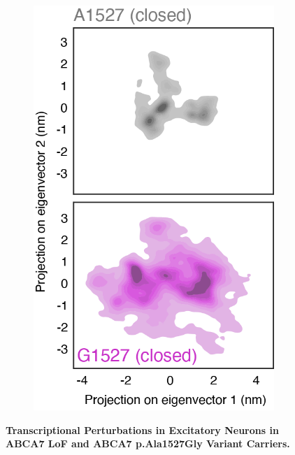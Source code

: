 \begin{figure}[H]
\begin{subfigure}[t]{0.16\textwidth}
        \includegraphics[width=\textwidth]{./main_plots/variant_projection_closed.png}        
    \end{subfigure}
    \caption{
        \textbf{Transcriptional Perturbations in Excitatory Neurons in ABCA7 LoF and ABCA7 p.Ala1527Gly Variant Carriers.}\\
    }
    \label{fig:main_neurons}
\end{figure}
